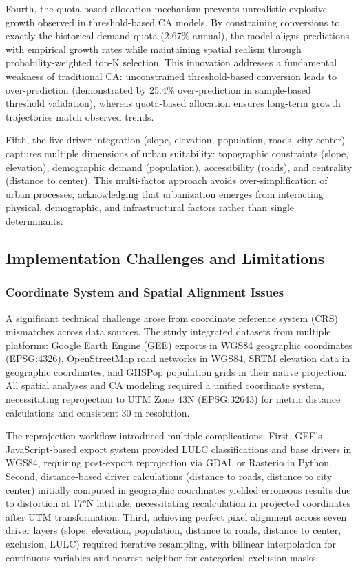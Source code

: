 \documentclass[12pt,a4paper]{article}
\begin{document}
Fourth, the quota-based allocation mechanism prevents unrealistic explosive growth observed in threshold-based CA models. By constraining conversions to exactly the historical demand quota (2.67\% annual), the model aligns predictions with empirical growth rates while maintaining spatial realism through probability-weighted top-K selection. This innovation addresses a fundamental weakness of traditional CA: unconstrained threshold-based conversion leads to over-prediction (demonstrated by 25.4\% over-prediction in sample-based threshold validation), whereas quota-based allocation ensures long-term growth trajectories match observed trends.

Fifth, the five-driver integration (slope, elevation, population, roads, city center) captures multiple dimensions of urban suitability: topographic constraints (slope, elevation), demographic demand (population), accessibility (roads), and centrality (distance to center). This multi-factor approach avoids over-simplification of urban processes, acknowledging that urbanization emerges from interacting physical, demographic, and infrastructural factors rather than single determinants.

\subsection{Implementation Challenges and Limitations}

\subsubsection{Coordinate System and Spatial Alignment Issues}

A significant technical challenge arose from coordinate reference system (CRS) mismatches across data sources. The study integrated datasets from multiple platforms: Google Earth Engine (GEE) exports in WGS84 geographic coordinates (EPSG:4326), OpenStreetMap road networks in WGS84, SRTM elevation data in geographic coordinates, and GHSPop population grids in their native projection. All spatial analyses and CA modeling required a unified coordinate system, necessitating reprojection to UTM Zone 43N (EPSG:32643) for metric distance calculations and consistent 30 m resolution.

The reprojection workflow introduced multiple complications. First, GEE's JavaScript-based export system provided LULC classifications and base drivers in WGS84, requiring post-export reprojection via GDAL or Rasterio in Python. Second, distance-based driver calculations (distance to roads, distance to city center) initially computed in geographic coordinates yielded erroneous results due to distortion at 17°N latitude, necessitating recalculation in projected coordinates after UTM transformation. Third, achieving perfect pixel alignment across seven driver layers (slope, elevation, population, distance to roads, distance to center, exclusion, LULC) required iterative resampling, with bilinear interpolation for continuous variables and nearest-neighbor for categorical exclusion masks.
\end{document}
